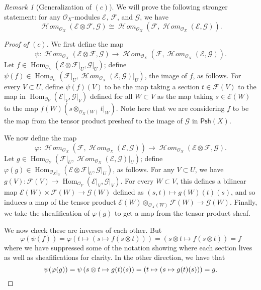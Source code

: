 \documentclass[10pt]{article}
\theoremstyle{definition}
\theoremstyle{remark}
\newtheorem*{remark}{Remark}
\numberwithin{equation}{section}
\numberwithin{figure}{subsubsection}
\DeclareMathOperator{\Hom}{Hom}
\newcommand{\EE}{\mathscr{E}}
\newcommand{\FF}{\mathscr{F}}
\newcommand{\GG}{\mathscr{G}}
\newcommand{\OO}{\mathcal{O}}
\newcommand{\Psh}{\mathsf{Psh}}
\DeclareMathOperator{\HHom}{\mathscr{H}\!\mathit{om}}
\begin{document}
\begin{remark}[Generalization of $(c)$]
  We will prove the following stronger statement: for any $\OO_X$-modules $\EE$, $\FF$, and $\GG$, we have
  \begin{equation*}
    \HHom_{\OO_X}(\EE\otimes\FF,\GG) \cong \HHom_{\OO_X}(\FF,\HHom_{\OO_X}(\EE,\GG)).
  \end{equation*}
\end{remark}
\begin{proof}[Proof of $(c)$]
  We first define the map
  \begin{equation*}
    \psi\colon \HHom_{\OO_X}(\EE\otimes\FF,\GG) \to \HHom_{\OO_X}(\FF,\HHom_{\OO_X}(\EE,\GG)).
  \end{equation*}
  Let $f \in \Hom_{\OO_U}(\EE\otimes\FF\vert_U,\GG\vert_U)$; define $\psi(f) \in \Hom_{\OO_U}(\FF\vert_U,\HHom_{\OO_X}(\EE,\GG)\vert_U)$, the image of $f$, as follows. For every $V \subset U$, define $\psi(f)(V)$ to be the map taking a section $t \in \FF(V)$ to the map in $\Hom_{\OO_V}(\EE\vert_V,\GG\vert_V)$ defined for all $W \subset V$ as the map taking $s \in \EE(W)$ to the map $f(W)(s \otimes_{\OO_X(W)} t\vert_W)$. Note here that we are considering $f$ to be the map from the tensor product presheaf to the image of $\GG$ in $\Psh(X)$.
  \par We now define the map
  \begin{equation*}
    \varphi\colon \HHom_{\OO_X}(\FF,\HHom_{\OO_X}(\EE,\GG)) \to \HHom_{\OO_X}(\EE\otimes\FF,\GG).
  \end{equation*}
  Let $g \in \Hom_{\OO_U}(\FF\vert_U,\HHom_{\OO_X}(\EE,\GG)\vert_U)$; define $\varphi(g) \in \Hom_{\OO_X\vert_U}(\EE\otimes\FF\vert_U,\GG\vert_U)$, as follows. For any $V \subset U$, we have $g(V)\colon\FF(V) \to \Hom_{\OO_V}(\EE\vert_V,\GG\vert_V)$. For every $W \subset V$, this defines a bilinear map $\EE(W) \times \FF(W) \to \GG(W)$ defined as $(s,t) \mapsto g(W)(t)(s)$, and so induces a map of the tensor product $\EE(W) \otimes_{\OO_X(W)} \FF(W) \to \GG(W)$. Finally, we take the sheafification of $\varphi(g)$ to get a map from the tensor product sheaf.
  \par We now check these are inverses of each other. But
  \begin{equation*}
    \varphi(\psi(f)) = \varphi\left( t \mapsto \left( s \mapsto f(s \otimes t) \right)\right) = \left( s \otimes t \mapsto f(s \otimes t) \right) = f
  \end{equation*}
  where we have suppressed some of the notation showing where each section lives as well as sheafifications for clarity. In the other direction, we have that
  \begin{equation*}
    \psi(\varphi(g)) = \psi\left( s \otimes t \mapsto g(t)(s) \right) = \left( t \mapsto \left( s \mapsto g(t)(s) \right) \right) = g.\qedhere
  \end{equation*}
\end{proof}
\end{document}
